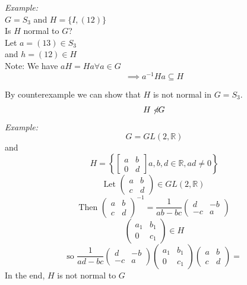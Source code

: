 \documentclass[11pt,letterpaper]{article}
\newenvironment{example}                             
        {\noindent\textit{Example:}\\}
	{}
\begin{document}
\begin{example}
  $G = S_3$ and $H = \{I, (12)\}$\\
  Is $H$ normal to $G$?\\

  Let $a = (13) \in S_3$\\
  and $h = (12) \in H$\\

  Note: We have $aH = Ha \forall a\in G$\\
  \[
    \implies a^{-1} H a \subseteq H
  \]
  
  By counterexample we can show that $H$ is not normal in $G = S_3$.
  \[
    H \not\!\triangleleft G
  \]
\end{example}
\begin{example}
  \[
    G = GL(2,\mathbb{R})
  \]
  and \[
    H = \left\{ \begin{bmatrix}
        a & b \\ 0 & d
    \end{bmatrix} a, b , d \in \mathbb{R}, ad \neq 0\right\}
  \]
  \[
    \text{Let } \begin{pmatrix}
      a & b \\ c & d 
    \end{pmatrix}
    \in GL(2, \mathbb{R})
  \]
  \[
    \text{Then } \begin{pmatrix}
      a & b \\ c & d 
    \end{pmatrix}^{-1}
    = \frac{1}{ab-bc} \begin{pmatrix}
      d & -b \\ -c & a 
    \end{pmatrix}
  \]
  \[
    \begin{pmatrix}
      a_1 & b_1 \\ 0 & c_1
    \end{pmatrix} \in H
  \]
  \[
    \text{so } \frac{1}{ad-bc} \begin{pmatrix}
      d & -b \\ -c & a 
    \end{pmatrix} \begin{pmatrix}
      a_1 & b_1 \\ 0 & c_1
    \end{pmatrix}\begin{pmatrix}
      a & b \\ c & d 
    \end{pmatrix} = %
  \]
  In the end, $H$ is not normal to $G$
\end{example}
\end{document}
